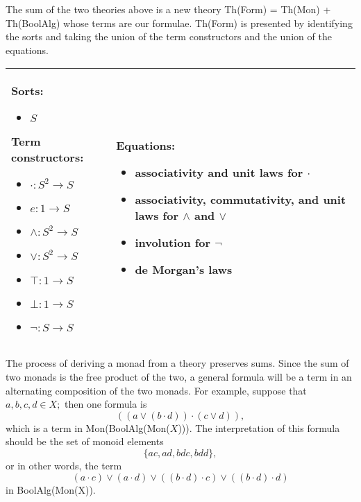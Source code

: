 \documentclass{llncs}
\newcommand{\maps}{\colon}
\begin{document}
The sum of the two theories above is a new theory Th(Form) = Th(Mon) + Th(BoolAlg) whose terms are our formulae.  Th(Form) is presented by identifying the sorts and taking the union of the term constructors and the union of the equations.
\begin{center}
  \begin{tabular}{|p{0.3\linewidth}|p{0.7\linewidth}|}
    \hline
    Sorts:
    \begin{itemize}
      \item $S$
    \end{itemize}
    Term constructors:
    \begin{itemize}
      \item $\cdot\maps S^2 \to S$
      \item $e\maps 1 \to S$
      \item $\land\maps S^2 \to S$
      \item $\lor\maps S^2 \to S$
      \item $\top\maps 1 \to S$
      \item $\bot\maps 1 \to S$
      \item $\neg\maps S \to S$
    \end{itemize}
    &
    Equations:
    \begin{itemize}
      \item associativity and unit laws for $\cdot$
      \item \raggedright associativity, commutativity, and unit laws for $\land$ and $\lor$
      \item involution for $\neg$
      \item de Morgan's laws
    \end{itemize}\\
    \hline
  \end{tabular}
\end{center}
The process of deriving a monad from a theory preserves sums.  Since the sum of two monads is the free product of the two, a general formula will be a term in an alternating composition of the two monads.  For example, suppose that $a, b, c, d \in X;$ then one formula is
\[ (({a}\lor{(b \cdot d)}) \cdot ({c}\lor{d})), \]
which is a term in Mon(BoolAlg(Mon($X$))).  The interpretation of this formula should be the set of monoid elements
\[ \{ ac, ad, bdc, bdd \}, \]
or in other words, the term
\[ (a \cdot c) \lor (a \cdot d) \lor ((b \cdot d) \cdot c) \lor ((b \cdot d) \cdot d) \]
in BoolAlg(Mon(X)).
\end{document}
